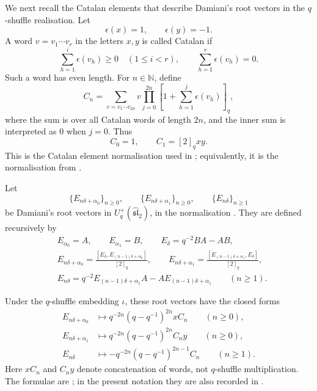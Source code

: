 \documentclass[11pt]{extarticle}
\theoremstyle{definition}
\theoremstyle{remark}
\numberwithin{equation}{section}
\newcommand{\N}{\mathbb N}
\newcommand{\Uplus}{U_q^+(\widehat{\mathfrak{sl}}_2)}
\newcommand{\comm}[2]{[ #1,#2 ]}
\begin{document}
We next recall the Catalan elements that describe Damiani's root vectors in
the \(q\)-shuffle realisation.  Let
\[
        \epsilon(x)=1,\qquad \epsilon(y)=-1 .
\]
A word \(v=v_1\cdots v_r\) in the letters \(x,y\) is called Catalan if
\[
 \sum_{h=1}^{i}\epsilon(v_h)\geq0\quad(1\leq i<r),
 \qquad
 \sum_{h=1}^{r}\epsilon(v_h)=0 .
\]
Such a word has even length.  For \(n\in\N\), define
\begin{equation}
\label{eq:Catalan-definition}
 C_n=
 \sum_{v=v_1\cdots v_{2n}}
 v\prod_{j=0}^{2n}
 \left[1+\sum_{h=1}^{j}\epsilon(v_h)\right]_q ,
\end{equation}
where the sum is over all Catalan words of length \(2n\), and the inner sum
is interpreted as \(0\) when \(j=0\).  Thus
\[
        C_0=1,\qquad C_1=[2]_qxy .
\]
This is the Catalan element normalisation used in
\cite[Section~4, equations following Definition~4.2]
{Terwilliger2019Alternating}; equivalently, it is the normalisation from
\cite[Theorem~1.7]{Terwilliger2019Catalan}.

Let
\[
 \{E_{n\delta+\alpha_0}\}_{n\geq0},\qquad
 \{E_{n\delta+\alpha_1}\}_{n\geq0},\qquad
 \{E_{n\delta}\}_{n\geq1}
\]
be Damiani's root vectors in \(\Uplus\), in the normalisation
\cite[Section~2, equations~(4)--(6)]{Terwilliger2019Alternating}.  They are
defined recursively by
\begin{align}
&E_{\alpha_0}=A,
\qquad E_{\alpha_1}=B,
\qquad E_\delta=q^{-2}BA-AB,
\label{eq:Damiani-initial}\\
&E_{n\delta+\alpha_0}
 =\frac{\comm{E_\delta}{E_{(n-1)\delta+\alpha_0}}}{[2]_q},
\qquad E_{n\delta+\alpha_1}
 =\frac{\comm{E_{(n-1)\delta+\alpha_1}}{E_\delta}}{[2]_q},
\label{eq:Damiani-real}\\
&E_{n\delta}
 =q^{-2}E_{(n-1)\delta+\alpha_1}A
   -AE_{(n-1)\delta+\alpha_1}
\qquad(n\geq1).
\label{eq:Damiani-imaginary}
\end{align}

Under the \(q\)-shuffle embedding \(\iota\), these root vectors have the
closed forms
\begin{align}
E_{n\delta+\alpha_0}
 &\longmapsto q^{-2n}(q-q^{-1})^{2n}xC_n
 \qquad(n\geq0),
\label{eq:Damiani-shuffle-0}\\
E_{n\delta+\alpha_1}
 &\longmapsto q^{-2n}(q-q^{-1})^{2n}C_ny
 \qquad(n\geq0),
\label{eq:Damiani-shuffle-1}\\
E_{n\delta}
 &\longmapsto -q^{-2n}(q-q^{-1})^{2n-1}C_n
 \qquad(n\geq1).
\label{eq:Damiani-shuffle-delta}
\end{align}
Here \(xC_n\) and \(C_ny\) denote concatenation of words, not
\(q\)-shuffle multiplication.  The formulae are
\cite[Theorem~1.7]{Terwilliger2019Catalan}; in the present notation they
are also recorded in
\cite[Section~4, after Definition~4.2]{Terwilliger2019Alternating}.
\end{document}
